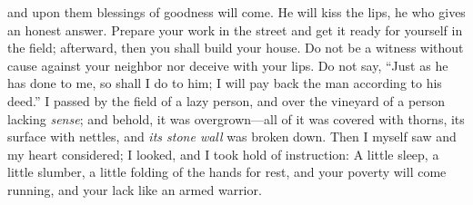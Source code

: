 \begin{biblechapter}
and upon them blessings of goodness will come.
\verse He will kiss the lips, 
he who gives an honest answer.
\verse Prepare your work in the street and get it ready for yourself in the field; 
afterward, then you shall build your house.
\verse Do not be a witness without cause against your neighbor 
nor deceive with your lips.
\verse Do not say, “Just as he has done to me, so shall I do to him; 
I will pay back the man according to his deed.”
\verse I passed by the field of a lazy person, 
and over the vineyard of a person lacking \textit{sense};
\verse and behold, it was overgrown—all of it was covered with thorns, its surface with nettles, 
and \textit{its stone wall} was broken down.
\verse Then I myself saw and my heart considered; 
I looked, and I took hold of instruction:
\verse A little sleep, a little slumber, 
a little folding of the hands for rest,
\verse and your poverty will come running, 
and your lack like an armed warrior.
\end{biblechapter}

